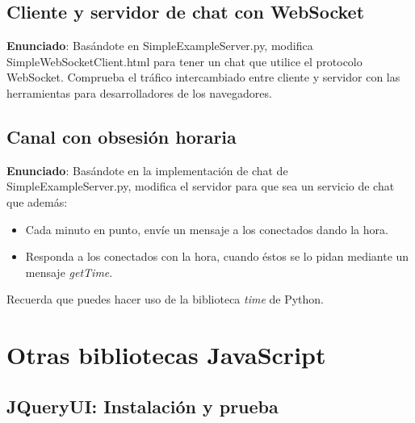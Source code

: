 \subsection{Cliente y servidor de chat con WebSocket}
\label{subsec:websocket-cliente-servidor-chat}

\textbf{Enunciado}: Basándote en SimpleExampleServer.py, modifica SimpleWebSocketClient.html para tener un chat que utilice el protocolo WebSocket. Comprueba el tráfico intercambiado entre cliente y servidor con las herramientas para desarrolladores de los navegadores.


\subsection{Canal con obsesión horaria}
\label{subsec:websocket-canal-obsesion-horaria}

\textbf{Enunciado}: Basándote en la implementación de chat de SimpleExampleServer.py, modifica el servidor para que sea un servicio de chat que además:
\begin{itemize}
  \item Cada minuto en punto, envíe un mensaje a los conectados dando la hora.
  \item Responda a los conectados con la hora, cuando éstos se lo pidan mediante un mensaje \emph{getTime}.
\end{itemize}

Recuerda que puedes hacer uso de la biblioteca \emph{time} de Python.

\section{Otras bibliotecas JavaScript}

\subsection{JQueryUI: Instalación y prueba}
\label{subsec:otras-jquery-instal}

